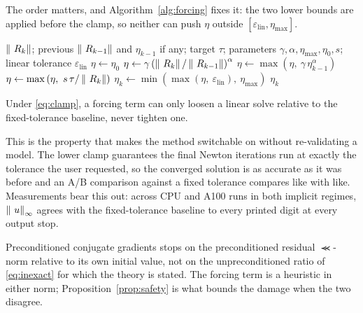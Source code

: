 The order matters, and Algorithm~\ref{alg:forcing} fixes it: the two lower
bounds are applied before the clamp, so neither can push $\eta$ outside
$[\varepsilon_{\mathrm{lin}}, \eta_{\max}]$.

\begin{algorithm}[h]
\caption{Forcing term at Newton iteration $k$}
\label{alg:forcing}
\begin{algorithmic}[1]
  \Require $\left\lVert ~R_k \right\rVert$; previous $\left\lVert ~R_{k-1} \right\rVert$ and $\eta_{k-1}$
           if any; target $\tau$; parameters $\gamma, \alpha, \eta_{\max},
           \eta_0, s$; linear tolerance $\varepsilon_{\mathrm{lin}}$
    \State $\eta \gets \eta_0$
  \Else
    \State $\eta \gets \gamma\left(\left\lVert ~R_k \right\rVert/\left\lVert ~R_{k-1} \right\rVert\right)^{\alpha}$
      \State $\eta \gets \max\left(\eta,\ \gamma\,\eta_{k-1}^{\alpha}\right)$
    \EndIf
  \EndIf
    \State $\eta \gets \max\left(\eta,\ s\,\tau/\norm{\Rvec_k}\right)$
  \EndIf
  \State $\eta_k \gets \min\left(\max\left(\eta,\ \varepsilon_{\mathrm{lin}}\right),\ \eta_{\max}\right)$
  \State \Return $\eta_k$
\end{algorithmic}
\end{algorithm}

\begin{proposition}[Safety]
\label{prop:safety}
Under \eqref{eq:clamp}, a forcing term can only loosen a linear solve relative
to the fixed-tolerance baseline, never tighten one.
\end{proposition}

\noindent This is the property that makes the method switchable on without
re-validating a model.  The lower clamp guarantees the final Newton iterations
run at exactly the tolerance the user requested, so the converged solution is
as accurate as it was before and an A/B comparison against a fixed tolerance
compares like with like.  Measurements bear this out: across CPU and A100 runs
in both implicit regimes, $\left\lVert ~u \right\rVert_\infty$ agrees with the
fixed-tolerance baseline to every printed digit at every output stop.

\begin{remark}
Preconditioned conjugate gradients stops on the preconditioned residual
$\Prec$-norm relative to its own initial value, not on the unpreconditioned
ratio of \eqref{eq:inexact} for which the theory is stated.  The forcing term
is a heuristic in either norm; Proposition~\ref{prop:safety} is what bounds the
damage when the two disagree.
\end{remark}

